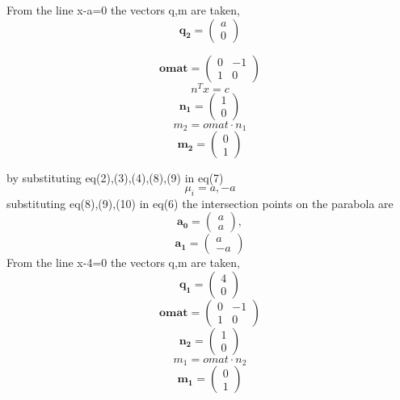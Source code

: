 \documentclass[journal,10pt,twocolumn]{article}
\let\vec\mathbf
\newcommand{\myvec}[1]{\ensuremath{\begin{pmatrix}#1\end{pmatrix}}}
\begin{document}
From the line x-a=0 the vectors q,m are taken,
\begin{equation}
\vec{q_2}=\myvec{a\\0}
\end{equation}

\begin{equation}
\vec{omat}=\myvec{0&-1\\1&0}
\end{equation} 
\begin{equation}
n^Tx=c
\end{equation} 
\begin{equation}
\vec{n_1}=\myvec{1\\0}
\end{equation}
\begin{equation}
m_2=omat\cdot n_1 
\end{equation}
\begin{equation}
\vec{m_2}=\myvec{0\\1}
\end{equation}

by substituting eq(2),(3),(4),(8),(9) in eq(7)
\begin{equation}
\mu_i=a,-a
\end{equation}
substituting eq(8),(9),(10) in eq(6) the intersection points on the parabola are
\begin{equation}
\vec{a_0}=\myvec{a\\a},
\end{equation}
\begin{equation}
\vec{a_1}=\myvec{a\\-a}
\end{equation}
From the line x-4=0 the vectors q,m are taken,
\begin{equation}
\vec{q_1}=\myvec{4\\0}
\end{equation}
\begin{equation}
\vec{omat}=\myvec{0&-1\\1&0}
\end{equation}
\begin{equation}
\vec{n_2}=\myvec{1\\0}                                                                
\end{equation}
\begin{equation}                                                                
 m_1=omat\cdot n_2
\end{equation}
\begin{equation}
\vec{m_1}=\myvec{0\\1}
\end{equation}
\end{document}
